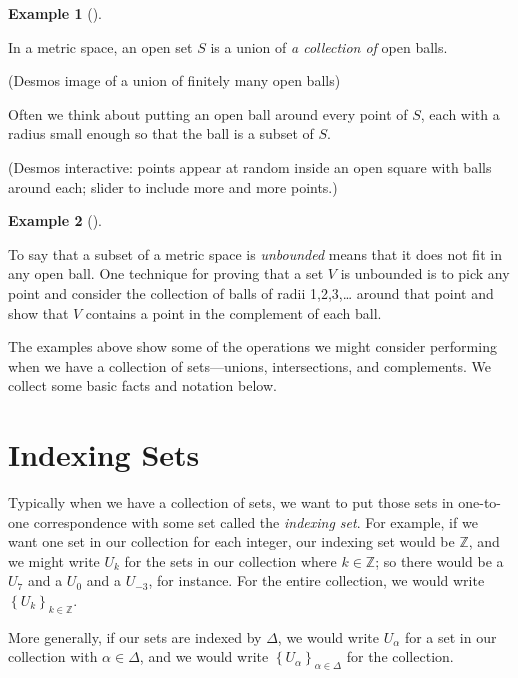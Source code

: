 \documentclass[
  letterpaper,
  DIV=11,
  numbers=noendperiod]{scrreprt}
\def\Z{\mathbb Z}
\theoremstyle{plain}
\theoremstyle{definition}
\theoremstyle{plain}
\theoremstyle{plain}
\theoremstyle{definition}
\newtheorem{example}{Example}[chapter]
\theoremstyle{definition}
\theoremstyle{remark}
\begin{document}
\begin{example}[]\protect\hypertarget{exm-open-set-union}{}\label{exm-open-set-union}

In a metric space, an open set \(S\) is a union of \emph{a collection
of} open balls.

(Desmos image of a union of finitely many open balls)

Often we think about putting an open ball around every point of \(S\),
each with a radius small enough so that the ball is a subset of \(S\).

(Desmos interactive: points appear at random inside an open square with
balls around each; slider to include more and more points.)

\end{example}

\begin{example}[]\protect\hypertarget{exm-bounded}{}\label{exm-bounded}

To say that a subset of a metric space is \emph{unbounded} means that it
does not fit in any open ball. One technique for proving that a set
\(V\) is unbounded is to pick any point and consider the collection of
balls of radii 1,2,3,\ldots{} around that point and show that \(V\)
contains a point in the complement of each ball.

\end{example}

The examples above show some of the operations we might consider
performing when we have a collection of sets---unions, intersections,
and complements. We collect some basic facts and notation below.

\section{Indexing Sets}\label{indexing-sets}

Typically when we have a collection of sets, we want to put those sets
in one-to-one correspondence with some set called the \emph{indexing
set}. For example, if we want one set in our collection for each
integer, our indexing set would be \(\Z\), and we might write \(U_k\)
for the sets in our collection where \(k\in\Z\); so there would be a
\(U_7\) and a \(U_0\) and a \(U_{-3}\), for instance. For the entire
collection, we would write \(\left\{U_k\right\}_{k\in\Z}\).

More generally, if our sets are indexed by \(\Delta\), we would write
\(U_\alpha\) for a set in our collection with \(\alpha\in\Delta\), and
we would write \(\left\{U_\alpha\right\}_{\alpha\in\Delta}\) for the
collection.
\end{document}

